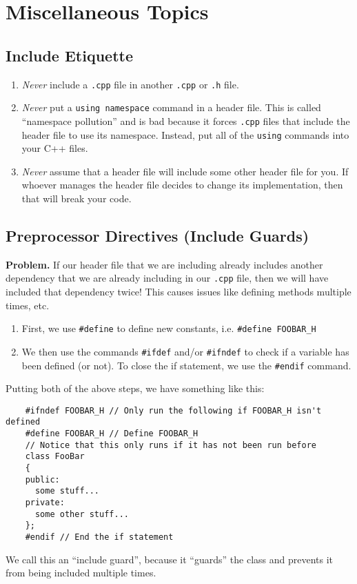 \documentclass[class=article, crop=false]{standalone}
\begin{document}
  \section{Miscellaneous Topics}
  \subsection{Include Etiquette}
  \begin{enumerate}[label=(\alph*)]
    \item \emph{Never} include a \texttt{.cpp} file in another \texttt{.cpp} or \texttt{.h} file.
    \item \emph{Never} put a \texttt{using namespace} command in a header file. This is called ``namespace pollution'' and is bad because it forces \texttt{.cpp} files that include the header file to use its namespace. Instead, put all of the \texttt{using} commands into your C++ files.
    \item \emph{Never} assume that a header file will include some other header file for you. If whoever manages the header file decides to change its implementation, then that will break your code.
  \end{enumerate}
  \subsection{Preprocessor Directives (Include Guards)}
  \textbf{Problem.} If our header file that we are including already includes another dependency that we are already including in our \texttt{.cpp} file, then we will have included that dependency twice! This causes issues like defining methods multiple times, etc.
  \begin{enumerate}[label=(\alph*)]
    \item First, we use \texttt{\#define} to define new constants, i.e. \texttt{\#define FOOBAR\_H}
    \item We then use the commands \texttt{\#ifdef} and/or \texttt{\#ifndef} to check if a variable has been defined (or not). To close the if statement, we use the \texttt{\#endif} command.
  \end{enumerate}
  Putting both of the above steps, we have something like this:
  \begin{lstlisting}
    #ifndef FOOBAR_H // Only run the following if FOOBAR_H isn't defined
    #define FOOBAR_H // Define FOOBAR_H
    // Notice that this only runs if it has not been run before
    class FooBar
    {
    public:
      some stuff...
    private:
      some other stuff...
    };
    #endif // End the if statement
  \end{lstlisting}
  We call this an ``include guard'', because it ``guards'' the class and prevents it from being included multiple times.
\end{document}
